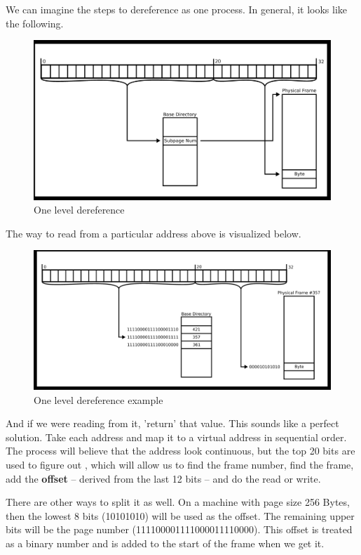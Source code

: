 We can imagine the steps to dereference as one process.
In general, it looks like the following.

\begin{figure}[H]
  \centering
  \includegraphics[width=1.0\textwidth]{ipc/drawings/level_split.eps}
  \caption{One level dereference}
\end{figure}

The way to read from a particular address above is visualized below.

\begin{figure}[H]
  \centering
  \includegraphics[width=1.0\textwidth]{ipc/drawings/level_split_filled.eps}
  \caption{One level dereference example}
\end{figure}

And if we were reading from it, 'return' that value.
This sounds like a perfect solution.
Take each address and map it to a virtual address in sequential order.
The process will believe that the address look continuous, but the top 20 bits are used to figure out ,
which will allow us to find the frame number, find the frame, add the \textbf{offset} -- derived from the last 12 bits -- and do the read or write.

There are other ways to split it as well.
On a machine with page size 256 Bytes, then the lowest 8 bits (10101010) will be used as the offset.
The remaining upper bits will be the page number (111100001111000011110000). This offset is treated as a binary number and is added to the start of the frame when we get it.

